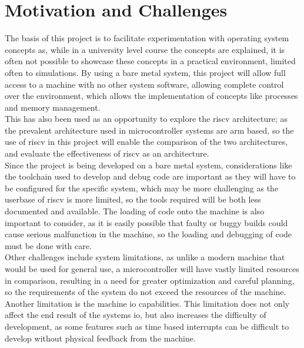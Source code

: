 \section{Motivation and Challenges}
The basis of this project is to facilitate experimentation with operating system concepts as, while in a university level course the concepts are explained, it is often not possible to showcase these concepts in a practical environment, limited often to simulations. By using a bare metal system, this project will allow full access to a machine with no other system software, allowing complete control over the environment, which allows the implementation of concepts like processes and memory management. \\
This has also been used as an opportunity to explore the \gls{riscv} architecture; as the prevalent architecture used in microcontroller systems are \gls{arm} based, so the use of \gls{riscv} in this project will enable the comparison of the two architectures, and evaluate the effectiveness of \gls{riscv} as an architecture.\\
Since the project is being developed on a bare metal system, considerations like the toolchain used to develop and debug code are important as they will have to be configured for the specific system, which may be more challenging as the userbase of \gls{riscv} is more limited, so the tools required will be both less documented and available. The loading of code onto the machine is also important to consider, as it is easily possible that faulty or buggy builds could cause serious malfunction in the machine, so the loading and debugging of code must be done with care.\\
Other challenges include system limitations, as unlike a modern machine that would be used for general use, a microcontroller will have vastly limited resources in comparison, resulting in a need for greater optimization and careful planning, so the requirements of the system do not exceed the resources of the machine. Another limitation is the machine \ac{io} capabilities. This limitation does not only affect the end result of the systems \ac{io}, but also increases the difficulty of development, as some features such as time based interrupts can be difficult to develop without physical feedback from the machine.


